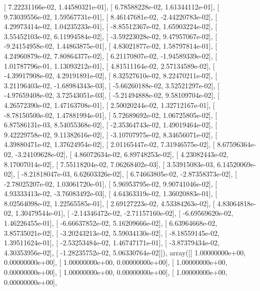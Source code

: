 \documentclass{article}
\begin{document}
       [  7.22231166e-02,   1.44580321e-01],
       [  6.78588228e-02,   1.61344112e-01],
       [  9.73039556e-02,   1.59567731e-01],
       [  8.46147681e-02,  -2.44220783e-02],
       [  4.29973414e-02,   1.04235233e-01],
       [ -8.85512367e-02,   1.65903224e-02],
       [  3.55452103e-02,   6.11994584e-02],
       [ -3.59223028e-02,   9.47957067e-02],
       [ -9.24154958e-02,   1.44863875e-01],
       [  4.83021877e-02,   1.58797814e-01],
       [  4.24960879e-02,   7.80864377e-02],
       [  6.21170807e-02,  -1.94589339e-02],
       [  1.01787796e-01,   1.13093212e-01],
       [  4.81511164e-02,   2.57134589e-02],
       [ -4.39917908e-02,   4.29191891e-02],
       [  8.32527610e-02,   8.22470211e-02],
       [  3.21196403e-02,  -1.68984343e-03],
       [ -5.66260188e-02,   3.52521297e-02],
       [ -4.97659408e-02,   3.72543051e-03],
       [ -5.21494888e-02,   9.58109704e-02],
       [  4.26572390e-02,   1.47163708e-01],
       [  2.50020244e-02,   1.32712167e-01],
       [ -8.78150500e-02,   1.47881994e-01],
       [  5.72689692e-02,   1.06725805e-02],
       [  6.87586131e-03,   8.54055368e-02],
       [ -2.35364743e-02,   1.49019464e-02],
       [  9.42229758e-02,   9.11382616e-02],
       [ -3.10707975e-02,   8.34656071e-02],
       [  4.39880471e-02,   1.37624954e-02],
       [  2.01165447e-02,   7.31946575e-02],
       [  8.67596364e-02,  -3.24109628e-02],
       [  4.86072634e-02,   6.89748253e-02],
       [  4.23082443e-02,   8.17007014e-02],
       [  7.55118204e-02,   7.06268402e-03],
       [  3.53915083e-03,   6.14520069e-02],
       [ -8.21818047e-03,   6.62603326e-02],
       [  6.74663805e-02,  -2.87358373e-02],
       [ -2.78025207e-02,   1.03061720e-01],
       [  5.96953795e-02,   9.90741046e-02],
       [  4.93333413e-02,  -3.76083492e-03],
       [  4.64363319e-02,   1.36020883e-01],
       [  8.02564098e-02,   1.22565585e-01],
       [  2.69127223e-02,   4.53384263e-02],
       [  4.83064818e-02,   1.30479544e-01],
       [ -2.14346472e-02,  -2.71157160e-02],
       [ -6.69569620e-02,   1.46226455e-01],
       [ -6.66637852e-02,   5.16209666e-02],
       [  6.63964668e-02,   3.85735021e-02],
       [ -3.20243213e-02,   5.59034130e-02],
       [ -8.18559145e-02,   1.39511624e-01],
       [ -2.53253484e-02,   1.46747171e-01],
       [ -3.87379434e-02,   4.30353956e-02],
       [ -1.28235752e-02,   5.06330764e-02]]), array([[  1.00000000e+00,   0.00000000e+00],
       [  1.00000000e+00,   0.00000000e+00],
       [  1.00000000e+00,   0.00000000e+00],
       [  1.00000000e+00,   0.00000000e+00],
       [  1.00000000e+00,   0.00000000e+00],
\end{document}
